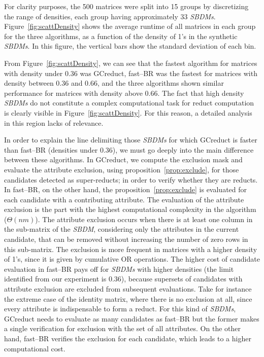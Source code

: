 \documentclass[authoryear,preprint,review,12pt]{elsarticle}
\begin{document}
	For clarity purposes, the 500 matrices were split into 15 groups by discretizing the range of densities, each group having approximately 33 \textit{SBDMs}. Figure~\ref{fig:scattDensity} shows the average runtime of all  matrices in each group for the three algorithms, as a function of the density of 1's in the synthetic \textit{SBDMs}. In this figure, the vertical bars show the standard deviation of each bin. 
		
	From Figure~\ref{fig:scattDensity}, we can see that the fastest algorithm for matrices with density under 0.36 was GCreduct, fast--BR was the fastest for matrices with density between 0.36 and 0.66, and the three algorithms shown similar performance for matrices with density above 0.66. The fact that high density \textit{SBDMs} do not constitute a complex computational task for reduct computation \citep{Rojas12} is clearly visible in Figure~\ref{fig:scattDensity}. For this reason, a detailed analysis in this region lacks of relevance.
		
	In order to explain the line delimiting those \textit{SBDMs} for which GCreduct is faster than fast--BR (densities under 0.36), we must go deeply into the main difference between these algorithms. In GCreduct, we compute the exclusion mask and evaluate the attribute exclusion, using proposition~\ref{prop:exclude}, for those candidates detected as super-reducts; in order to verify whether they are reducts. In fast--BR, on the other hand, the proposition~\ref{prop:exclude} is evaluated for each candidate with a contributing attribute. The evaluation of the attribute exclusion is the part with the highest computational complexity in the algorithm ($\Theta (nm)$). The attribute exclusion occurs when there is at least one column in the sub-matrix of the \textit{SBDM}, considering only the attributes in the current candidate, that can be removed without increasing the number of zero rows in this sub-matrix. The exclusion is more frequent in matrices with a higher density of 1's, since it is given by cumulative OR operations. The higher cost of candidate evaluation in fast--BR pays off for \textit{SBDMs} with higher densities (the limit identified from our experiment is 0.36), because supersets of candidates with attribute exclusion are excluded from subsequent evaluations. Take for instance the extreme case of the identity matrix, where there is no exclusion at all, since every attribute is indispensable to form a reduct. For this kind of \textit{SBDMs}, GCreduct needs to evaluate as many candidates as fast--BR but the former makes a single verification for exclusion with the set of all attributes. On the other hand, fast--BR verifies the exclusion for each candidate, which leads to a higher computational cost.
	
\end{document}
